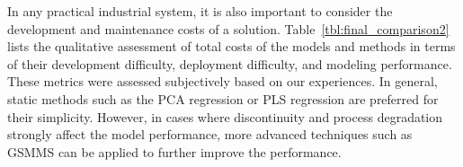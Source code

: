 In any practical industrial system, it is also important to consider
the development and maintenance costs of a solution. Table~\ref{tbl:final_comparison2} lists the qualitative assessment of total costs of the models and methods in terms of their development
difficulty, deployment difficulty, and modeling performance. These metrics
were assessed subjectively based on our experiences. In general, static methods such as the PCA regression or PLS regression are preferred for their simplicity. However, in cases where discontinuity and process degradation strongly affect the model performance, more advanced techniques such as GSMMS can be applied to further improve the performance.
